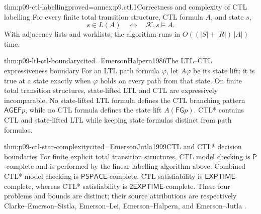 \begin{hbtheorem}{thm:p09-ctl-labelling}{proved=annex:p9.ctl.1}{Correctness and complexity of CTL labelling}
For every finite total transition structure, CTL formula \(A\), and state
\(s\),
\[
 s\in L(A)\quad\Longleftrightarrow\quad\mathcal K,s\models A.
\]
With adjacency lists and worklists, the algorithm runs in
\(O((|S|+|R|)\,|A|)\) time.
\end{hbtheorem}

\begin{hbtheorem}{thm:p09-ltl-ctl-boundary}{cited=EmersonHalpern1986}{The LTL--CTL expressiveness boundary}
For an LTL path formula \(\varphi\), let \(A\varphi\) be its state lift: it is
true at a state exactly when \(\varphi\) holds on every path from that state.
On finite total transition structures, state-lifted LTL and CTL are
expressively incomparable.  No state-lifted LTL formula defines the CTL
branching pattern \(\mathsf{AG}\mathsf{EF}p\), while no CTL formula defines the
state lift \(A(\mathsf F\mathsf Gp)\).  CTL* contains CTL and state-lifted LTL
while keeping state formulas distinct from path formulas.
\end{hbtheorem}

\begin{hbtheorem}{thm:p09-ctl-star-complexity}{cited=EmersonJutla1999}{CTL and CTL* decision boundaries}
For finite explicit total transition structures, CTL model checking is
\(\mathsf P\)-complete and is performed by the linear labelling algorithm
above.  Combined CTL* model checking is \(\mathsf{PSPACE}\)-complete.  CTL
satisfiability is \(\mathsf{EXPTIME}\)-complete, whereas CTL* satisfiability is
\(\mathsf{2EXPTIME}\)-complete. These four problems and bounds are distinct;
their source attributions are respectively Clarke--Emerson--Sistla,
Emerson--Lei, Emerson--Halpern, and Emerson--Jutla
\cite{ClarkeEmersonSistla1986,EmersonLei1987,EmersonHalpern1985,EmersonJutla1999}.
\end{hbtheorem}

